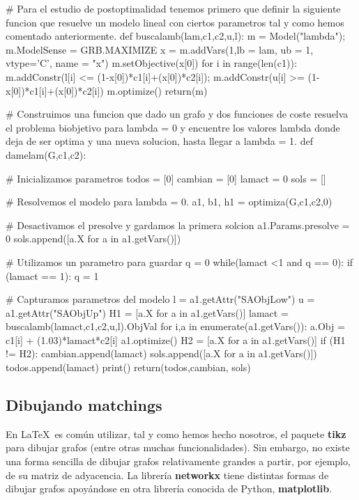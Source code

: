 \documentclass[twoside,a4paper,openright,12pt]{book}
\begin{document}
\begin{pythone}
# Para el estudio de postoptimalidad tenemos primero que definir la siguiente funcion que resuelve un modelo lineal con ciertos parametros tal y como hemos comentado anteriormente.
def buscalamb(lam,c1,c2,u,l):  
    m = Model("lambda");
    m.ModelSense = GRB.MAXIMIZE
    x = m.addVars(1,lb = lam, ub = 1, vtype='C', name = "x")
    m.setObjective(x[0])
    for i in range(len(c1)):
        m.addConstr(l[i] <= (1-x[0])*c1[i]+(x[0])*c2[i]);
        m.addConstr(u[i] >= (1-x[0])*c1[i]+(x[0])*c2[i])
    m.optimize()    
    return(m)
    

# Construimos una funcion que dado un grafo y dos funciones de coste resuelva el problema biobjetivo para lambda = 0 y encuentre los valores lambda donde deja de ser optima y una nueva solucion, hasta llegar a lambda = 1.
def damelam(G,c1,c2):
    
    # Inicializamos parametros
    todos = [0]
    cambian = [0]
    lamact = 0
    sols = []
    
    # Resolvemos el modelo para lambda = 0.
    a1, b1, h1 = optimiza(G,c1,c2,0)
    
    # Desactivamos el presolve y gardamos la primera solcion
    a1.Params.presolve = 0
    sols.append([a.X for a in a1.getVars()])
    
    # Utilizamos un parametro para guardar 
    q = 0
    while(lamact <1 and q == 0):
        if (lamact == 1):
            q = 1
            
        # Capturamos parametros del modelo
        l = a1.getAttr("SAObjLow")
        u = a1.getAttr("SAObjUp")
        H1 = [a.X for a in a1.getVars()]
        lamact = buscalamb(lamact,c1,c2,u,l).ObjVal
        for i,a in enumerate(a1.getVars()):
            a.Obj = c1[i] + (1.03)*lamact*c2[i]
        a1.optimize()
        H2 = [a.X for a in a1.getVars()]
        if (H1 != H2):
            cambian.append(lamact)
        sols.append([a.X for a in a1.getVars()])
        todos.append(lamact)
    print()
    return(todos,cambian, sols)
\end{pythone}
\newpage
\subsection{Dibujando matchings}
En \LaTeX\, es común utilizar, tal y como hemos hecho nosotros, el paquete \textbf{tikz} para dibujar grafos (entre otras muchas funcionalidades). Sin embargo, no existe una forma sencilla de dibujar grafos relativamente grandes a partir, por ejemplo, de su matriz de adyacencia. La librería \textbf{networkx} tiene distintas formas de dibujar grafos apoyándose en otra librería conocida de Python, \textbf{matplotlib}. 
\end{document}
